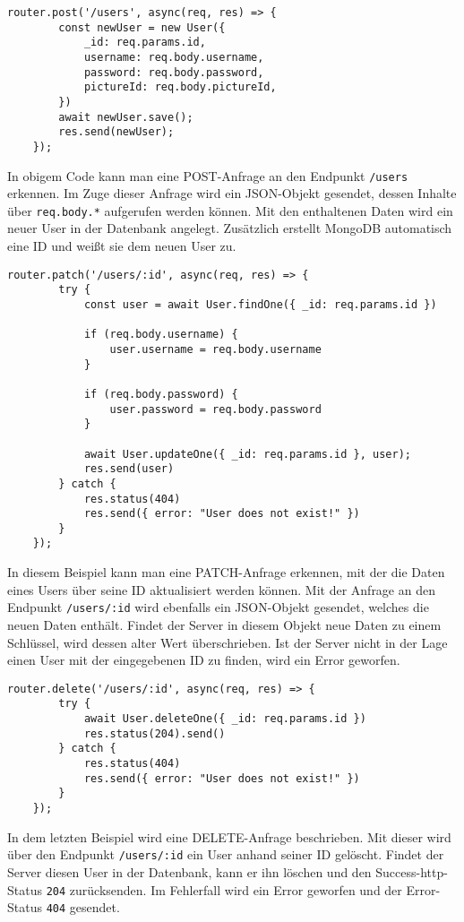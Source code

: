 \begin{lstlisting}[caption=POST-Request, label=lst:postrequest]
    router.post('/users', async(req, res) => {
        const newUser = new User({
            _id: req.params.id,
            username: req.body.username,
            password: req.body.password,
            pictureId: req.body.pictureId,
        })
        await newUser.save();
        res.send(newUser);
    });
\end{lstlisting}

In obigem Code kann man eine POST-Anfrage an den Endpunkt \texttt{/users} erkennen. Im Zuge dieser Anfrage wird ein JSON-Objekt gesendet, dessen Inhalte über \texttt{req.body.*} aufgerufen werden können. Mit den enthaltenen Daten wird ein neuer User in der Datenbank angelegt. Zusätzlich erstellt MongoDB automatisch eine ID und weißt sie dem neuen User zu.

\begin{lstlisting}[caption=PATCH-Request, label=lst:patchrequest]
    router.patch('/users/:id', async(req, res) => {
        try {
            const user = await User.findOne({ _id: req.params.id })

            if (req.body.username) {
                user.username = req.body.username
            }

            if (req.body.password) {
                user.password = req.body.password
            }

            await User.updateOne({ _id: req.params.id }, user);
            res.send(user)
        } catch {
            res.status(404)
            res.send({ error: "User does not exist!" })
        }
    });
\end{lstlisting}

In diesem Beispiel kann man eine PATCH-Anfrage erkennen, mit der die Daten eines Users über seine ID aktualisiert werden können. Mit der Anfrage an den Endpunkt \texttt{/users/:id} wird ebenfalls ein JSON-Objekt gesendet, welches die neuen Daten enthält. Findet der Server in diesem Objekt neue Daten zu einem Schlüssel, wird dessen alter Wert überschrieben. Ist der Server nicht in der Lage einen User mit der eingegebenen ID zu finden, wird ein Error geworfen.

\begin{lstlisting}[caption=DELETE-Request, label=lst:deleterequest]
    router.delete('/users/:id', async(req, res) => {
        try {
            await User.deleteOne({ _id: req.params.id })
            res.status(204).send()
        } catch {
            res.status(404)
            res.send({ error: "User does not exist!" })
        }
    });
\end{lstlisting}

In dem letzten Beispiel wird eine DELETE-Anfrage beschrieben. Mit dieser wird über den Endpunkt \texttt{/users/:id} ein User anhand seiner ID gelöscht. Findet der Server diesen User in der Datenbank, kann er ihn löschen und den Success-http-Status \texttt{204} zurücksenden. Im Fehlerfall wird ein Error geworfen und der Error-Status \texttt{404} gesendet.
